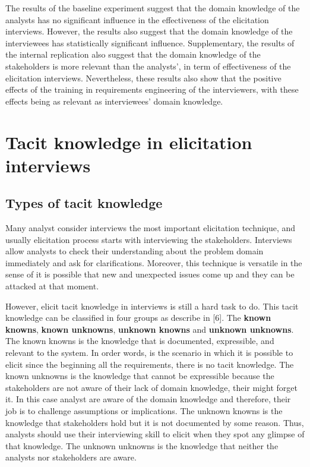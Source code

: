 \documentclass[]{llncs}
\begin{document}
The results of the baseline experiment suggest that the domain knowledge
of the analysts has no significant influence in the effectiveness of the
elicitation interviews. However, the results also suggest that the
domain knowledge of the interviewees has statistically significant
influence. Supplementary, the results of the internal replication also
suggest that the domain knowledge of the stakeholders is more relevant
than the analysts', in term of effectiveness of the elicitation
interviews. Nevertheless, these results also show that the positive
effects of the training in requirements engineering of the interviewers,
with these effects being as relevant as interviewees' domain knowledge.

\hypertarget{tacit-knowledge-in-elicitation-interviews}{%
\section{Tacit knowledge in elicitation
interviews}\label{tacit-knowledge-in-elicitation-interviews}}

\hypertarget{types-of-tacit-knowledge}{%
\subsection{Types of tacit knowledge}\label{types-of-tacit-knowledge}}

Many analyst consider interviews the most important elicitation
technique, and usually elicitation process starts with interviewing the
stakeholders. Interviews allow analysts to check their understanding
about the problem domain immediately and ask for clarifications.
Moreover, this technique is versatile in the sense of it is possible
that new and unexpected issues come up and they can be attacked at that
moment.

However, elicit tacit knowledge in interviews is still a hard task to
do. This tacit knowledge can be classified in four groups as describe in
{[}6{]}. The \textbf{known knowns}, \textbf{known unknowns},
\textbf{unknown knowns} and \textbf{unknown unknowns}. The known knowns
is the knowledge that is documented, expressible, and relevant to the
system. In order words, is the scenario in which it is possible to
elicit since the beginning all the requirements, there is no tacit
knowledge. The known unknowns is the knowledge that cannot be
expressible because the stakeholders are not aware of their lack of
domain knowledge, their might forget it. In this case analyst are aware
of the domain knowledge and therefore, their job is to challenge
assumptions or implications. The unknown knowns is the knowledge that
stakeholders hold but it is not documented by some reason. Thus,
analysts should use their interviewing skill to elicit when they spot
any glimpse of that knowledge. The unknown unknowns is the knowledge
that neither the analysts nor stakeholders are aware.
\end{document}
